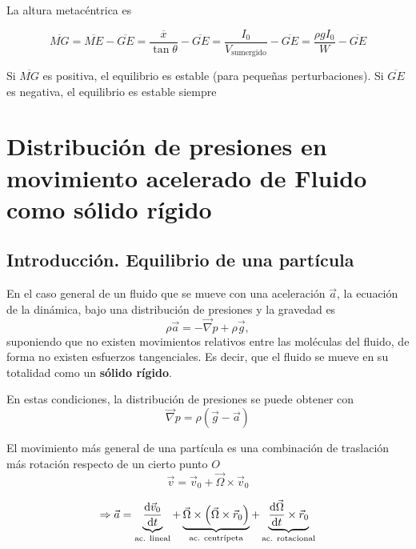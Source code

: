 La altura metacéntrica es

\begin{equation}
	\overline{MG} = \overline{ME}-\overline{GE}= \frac{\overline{x}}{\tan \theta} - \overline{GE} 
= \frac{I_0}{V_{\textrm{sumergido}}} - \overline{GE} = \frac{\rho g I_0}{W} - \overline{GE}
\end{equation}

Si $\overline{MG}$ es positiva, el equilibrio es estable (para peque\~nas perturbaciones). Si 
$\overline{GE}$ es negativa, el equilibrio es estable siempre

\section[Presiones con aceleración]{Distribución de presiones en movimiento acelerado de Fluido como sólido rígido}

\subsection{Introducción. Equilibrio de una partícula}

En el caso general de un fluido que se mueve con una aceleración $\vec{a}$, la ecuación de la dinámica, bajo una distribución de presiones y la gravedad es
\begin{equation}
	\rho \vec a = -\vec \nabla p+ \rho \vec g,
\end{equation} 
suponiendo que no existen movimientos relativos entre las moléculas del fluido, de forma no existen esfuerzos tangenciales. Es decir, que el fluido se mueve en su totalidad como un \textbf{sólido rígido}.

En estas condiciones, la distribución de presiones se puede obtener con 
\begin{equation}
	\vec \nabla p = \rho (\vec g-\vec a)
	\label{ec:principal}
\end{equation} 


El movimiento más general de una partícula es una combinación de traslación más rotación respecto de un cierto punto $O$
\begin{equation}
	\vec v = \vec v_0 + \vec \Omega \times \vec v_0
\end{equation} 

\begin{equation}
	\Rightarrow \vec a = \underbrace{\frac{\textrm{d} \vec v_0}{\textrm{d} t}}_{\textrm{ac. lineal}} + \underbrace{\vec \Omega \times \left( \vec \Omega \times \vec r_0\right)}_{\textrm{ac. centrípeta}} + \underbrace{\frac{\textrm{d} \vec \Omega}{\textrm{d} t} \times \vec r_0}_{\textrm{ac. rotacional}}
	\label{ec:SR}
\end{equation} 


